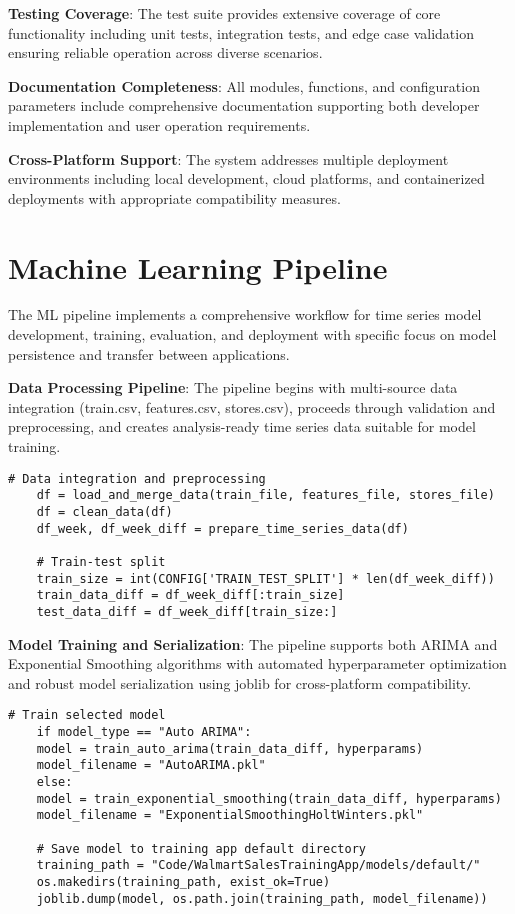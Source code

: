 \textbf{Testing Coverage}: The test suite provides extensive coverage of core functionality including unit tests, integration tests, and edge case validation ensuring reliable operation across diverse scenarios.

\textbf{Documentation Completeness}: All modules, functions, and configuration parameters include comprehensive documentation supporting both developer implementation and user operation requirements.

\textbf{Cross-Platform Support}: The system addresses multiple deployment environments including local development, cloud platforms, and containerized deployments with appropriate compatibility measures.

\section{Machine Learning Pipeline}

The ML pipeline implements a comprehensive workflow for time series model development, training, evaluation, and deployment with specific focus on model persistence and transfer between applications.

\textbf{Data Processing Pipeline}: The pipeline begins with multi-source data integration (train.csv, features.csv, stores.csv), proceeds through validation and preprocessing, and creates analysis-ready time series data suitable for model training.

\begin{lstlisting}[style=bashstyle, caption={ML Pipeline Data Processing}]
	# Data integration and preprocessing
	df = load_and_merge_data(train_file, features_file, stores_file)
	df = clean_data(df)
	df_week, df_week_diff = prepare_time_series_data(df)
	
	# Train-test split
	train_size = int(CONFIG['TRAIN_TEST_SPLIT'] * len(df_week_diff))
	train_data_diff = df_week_diff[:train_size]
	test_data_diff = df_week_diff[train_size:]
\end{lstlisting}

\textbf{Model Training and Serialization}: The pipeline supports both ARIMA and Exponential Smoothing algorithms with automated hyperparameter optimization and robust model serialization using joblib for cross-platform compatibility.

\begin{lstlisting}[style=bashstyle, caption={Model Training and Serialization}]
	# Train selected model
	if model_type == "Auto ARIMA":
	model = train_auto_arima(train_data_diff, hyperparams)
	model_filename = "AutoARIMA.pkl"
	else:
	model = train_exponential_smoothing(train_data_diff, hyperparams)
	model_filename = "ExponentialSmoothingHoltWinters.pkl"
	
	# Save model to training app default directory
	training_path = "Code/WalmartSalesTrainingApp/models/default/"
	os.makedirs(training_path, exist_ok=True)
	joblib.dump(model, os.path.join(training_path, model_filename))
\end{lstlisting}

